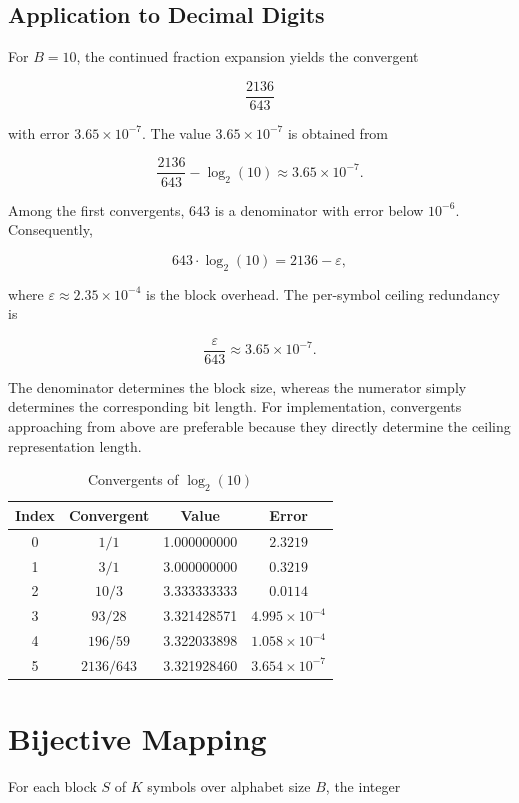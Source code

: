 \documentclass[10pt, conference]{IEEEtran}
\begin{document}
\subsection{Application to Decimal Digits}

For $B=10$, the continued fraction expansion yields the convergent

\[
\frac{2136}{643}
\]

with error $3.65\times10^{-7}$. The value $3.65\times10^{-7}$ is obtained from

\[
\frac{2136}{643} - \log_2(10) \approx 3.65\times10^{-7}.
\]

Among the first convergents, $643$ is a denominator with error below $10^{-6}$. Consequently,

\[
643 \cdot \log_2(10) = 2136 - \varepsilon,
\]

where $\varepsilon \approx 2.35 \times 10^{-4}$ is the block overhead. The per-symbol ceiling redundancy is

\[
\frac{\varepsilon}{643} \approx 3.65\times10^{-7}.
\]

The denominator determines the block size, whereas the numerator simply determines the corresponding bit length. For implementation, convergents approaching from above are preferable because they directly determine the ceiling representation length.

\begin{table}[ht]
\centering
\caption{Convergents of $\log_2(10)$}
\label{tab:convergents}
\begin{tabular}{cccc}
\toprule
Index & Convergent & Value & Error \\
\midrule
0 & $1/1$ & 1.000000000 & $2.3219$ \\
1 & $3/1$ & 3.000000000 & $0.3219$ \\
2 & $10/3$ & 3.333333333 & $0.0114$ \\
3 & $93/28$ & 3.321428571 & $4.995\times10^{-4}$ \\
4 & $196/59$ & 3.322033898 & $1.058\times10^{-4}$ \\
5 & $2136/643$ & 3.321928460 & $3.654\times10^{-7}$ \\
\bottomrule
\end{tabular}
\end{table}

\section{Bijective Mapping}

For each block $S$ of $K$ symbols over alphabet size $B$, the integer
\end{document}

